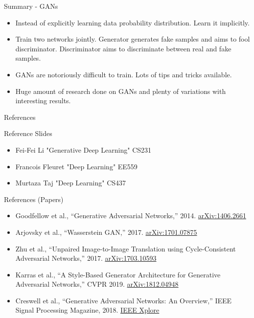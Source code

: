 \begin{frame}{Summary - GANs}
\begin{itemize}
    \item Instead of explicitly learning data probability distribution. Learn it implicitly.
    \item Train two networks jointly. Generator generates fake samples and aims to fool discriminator. Discriminator aims to discriminate between real and fake samples.
    \item GANs are notoriously difficult to train. Lots of tips and tricks available.
    \item Huge amount of research done on GANs and plenty of variations with interesting results.
\end{itemize}
\end{frame}

\begin{frame}{References}

Reference Slides
\begin{itemize}
    \item Fei-Fei Li "Generative Deep Learning" CS231
    \item Francois Fleuret "Deep Learning" EE559
    \item Murtaza Taj "Deep Learning" CS437
\end{itemize}
    
\end{frame}

\begin{frame}{References (Papers)}

\begin{itemize}
    \item Goodfellow et al., ``Generative Adversarial Networks,'' 2014. \href{https://arxiv.org/abs/1406.2661}{arXiv:1406.2661}
    \item Arjovsky et al., ``Wasserstein GAN,'' 2017. \href{https://arxiv.org/abs/1701.07875}{arXiv:1701.07875}
    \item Zhu et al., ``Unpaired Image-to-Image Translation using Cycle-Consistent Adversarial Networks,'' 2017. \href{https://arxiv.org/abs/1703.10593}{arXiv:1703.10593}
    \item Karras et al., ``A Style-Based Generator Architecture for Generative Adversarial Networks,'' CVPR 2019. \href{https://arxiv.org/abs/1812.04948}{arXiv:1812.04948}
    \item Creswell et al., ``Generative Adversarial Networks: An Overview,'' IEEE Signal Processing Magazine, 2018. \href{https://ieeexplore.ieee.org/document/8280743}{IEEE Xplore}
\end{itemize}

\end{frame}